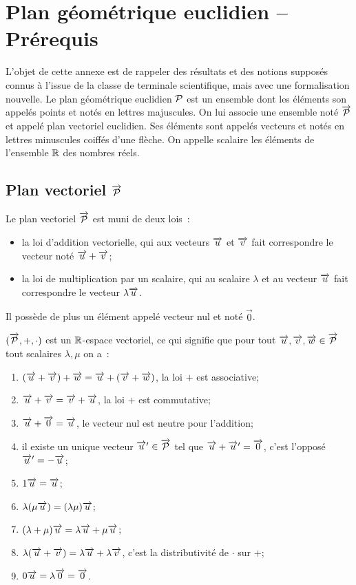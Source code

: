 \chapter{Plan géométrique euclidien -- Prérequis}

L'objet de cette annexe est de rappeler des résultats et des notions supposés 
connus à l'issue de la classe de terminale scientifique, mais avec une 
formalisation nouvelle. Le plan géométrique euclidien $\P$ est un ensemble dont 
les éléments son appelés points et notés en lettres majuscules. On lui associe 
une ensemble noté $\vect{\P}$ et appelé plan vectoriel euclidien. Ses éléments 
sont appelés vecteurs et notés en lettres minuscules coiffés d'une flèche. On 
appelle scalaire les éléments de l'ensemble $\R$ des nombres réels.

\section{Plan vectoriel $\protect\vect{\P}$}

Le plan vectoriel $\vect{\P}$ est muni de deux lois~:
\begin{itemize}
  \item la loi d'addition vectorielle, qui aux vecteurs $\vu$ et $\vv$ fait 
    correspondre le vecteur noté $\vu +\vv$;
  \item la loi de multiplication par un scalaire, qui au scalaire $\lambda$ et 
    au vecteur $\vu$ fait correspondre le vecteur $\lambda \vu$.
\end{itemize}

Il possède de plus un élément appelé vecteur nul et noté $\vec{0}$.

\begin{prop}
  $(\vect{\P}, +, \cdot)$ est un $\R$-espace vectoriel, ce qui signifie que pour 
  tout $\vu,\vv,\vw \in \vect{\P}$ tout scalaires $\lambda,\mu$ on a~:
  \begin{enumerate}
    \item $(\vu+\vv)+\vw=\vu +(\vv+\vw)$, la loi $+$ est associative;
    \item $\vu+\vv=\vv+\vu$, la loi $+$ est commutative;
    \item $\vu+\vect{0}=\vu$, le vecteur nul est neutre pour l'addition;
    \item il existe un unique vecteur $\vu' \in \vect{\P}$ tel que 
      $\vu+\vu'=\vect{0}$, c'est l'opposé $\vu'=-\vu$;
    \item $1 \vu=\vu$;
    \item $\lambda(\mu \vu)=(\lambda \mu) \vu$;
    \item $(\lambda+\mu) \vu = \lambda\vu +\mu\vu$;
    \item $\lambda(\vu+\vv)=\lambda \vu +\lambda\vv$, c'est la distributivité de 
      $\cdot$ sur $+$;
    \item $0 \vu = \lambda \vect{0}=\vect{0}$.
  \end{enumerate}
\end{prop}

